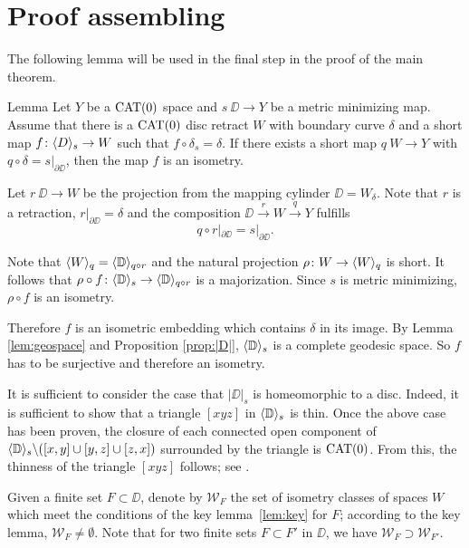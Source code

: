 \section{Proof assembling}\label{Main theorem}

The following lemma will be used in the final step in the proof of the main theorem.

\begin{thm}{Lemma}\label{lem:maj is isom}
Let $Y$ be a $\mathop{\rm CAT}\nolimits(0)$ space and $s\:\DD\to Y$ be a metric minimizing map.
Assume that there is a $\mathop{\rm CAT}\nolimits(0)$ disc retract $W$ with boundary curve $\delta$ and a short map $f\colon\langle D\rangle_s \to W$
such that $f\circ \delta_s=\delta$. If there exists a short map 
$q\: W\to Y$ with $q\circ \delta=s|_{\partial \DD}$, then the map $f$ is an isometry.
\end{thm}

Let $r\:\DD\to W$ be the projection from the mapping cylinder $\DD=W_\delta$. 
Note that $r$ is a retraction, $r|_{\partial \DD}=\delta$ and the composition $\DD\xrightarrow{r}W\xrightarrow{q} Y$ fulfills \[q\circ r|_{\partial \DD}=s|_{\partial \DD}.\]

Note that  $\langle W\rangle_q=\langle\mathbb{D}\rangle_{q\circ r}$ and the natural projection $\rho\colon W\to \langle W\rangle_q$ is short.
It follows that $\rho\circ f\colon \langle\mathbb{D}\rangle_s\to \langle\mathbb{D}\rangle_{q\circ r}$ is a majorization.
Since $s$ is metric minimizing, $\rho\circ f$ is an isometry. 

Therefore $f$ is an isometric embedding which contains $\delta$
in its image. 
By Lemma \ref{lem:geospace} and Proposition \ref{prop:|D|}, $\langle\mathbb{D}\rangle_s$ is a complete geodesic space.
So $f$ has to be surjective and therefore an isometry.
\qeds

It is sufficient to consider
the case that $|\DD|_s$ is  homeomorphic to a disc.
Indeed, it is sufficient to show that a triangle $[xyz]$ in $\langle\mathbb{D}\rangle_s$ is thin. 
Once the above case has been proven, the closure of each connected open component of $\langle\mathbb{D}\rangle_s\backslash ([x,y]\cup[y,z]\cup[z,x])$
surrounded by the triangle is $\mathop{\rm CAT}\nolimits(0)$.
From this, the thinness of the triangle $[xyz]$ follows; see \cite{bishop}.

Given a finite set $F\subset \DD$,
denote by $\mathcal{W}_F$
the set of isometry classes of spaces $W$ which meet the conditions of the key lemma~\ref{lem:key}
for $F$;
according to the key lemma, $\mathcal{W}_F\ne\emptyset$.
Note that for two finite sets $F\subset F'$ in $\DD$,
we have $\mathcal{W}_F\supset \mathcal{W}_{F'}$.

